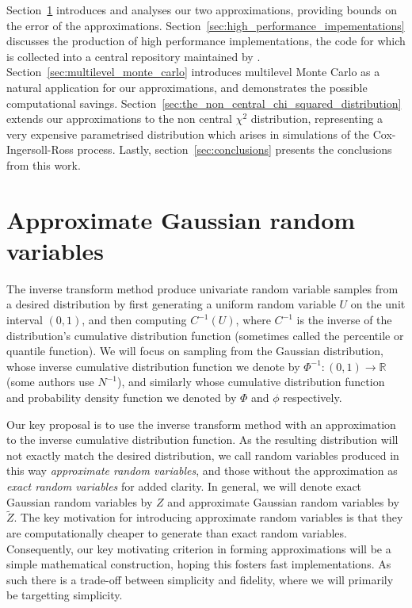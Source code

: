 \documentclass[manuscript,review]{acmart}
\begin{document}
Section~\ref{sec:approximate_gaussian_random_variables} introduces and analyses our two approximations, providing bounds on the error of the approximations. Section~\ref{sec:high_performance_impementations} discusses the production of high performance implementations, the code for which is collected into a central repository maintained by \citet{sheridan2020approximate_random,sheridan2020approximate_inverse}. Section~\ref{sec:multilevel_monte_carlo} introduces multilevel Monte Carlo as a natural application for our approximations, and demonstrates the possible computational savings. Section~\ref{sec:the_non_central_chi_squared_distribution} extends our approximations to the non central $ \chi^2 $ distribution, representing a very expensive parametrised distribution which arises in simulations of the Cox-Ingersoll-Ross process. Lastly, section~\ref{sec:conclusions} presents the conclusions from this work. 

\section{Approximate Gaussian random variables}
\label{sec:approximate_gaussian_random_variables}

The inverse transform method \citep[2.2.1]{glasserman2013monte} produce univariate random variable samples from a desired distribution by first generating a uniform random variable $U$ on the unit interval $(0,1)$, and then computing $C^{-1}(U)$, where $C^{-1}$ is the inverse of the distribution's cumulative distribution function (sometimes called the percentile or quantile function). We will focus on sampling from the Gaussian distribution, whose inverse cumulative distribution function we denote by $ \Phi^{-1} \colon (0, 1) \to \mathbb{R} $ (some authors use $ N^{-1} $), and similarly whose cumulative distribution function and probability density function we denoted by $ \Phi $ and $ \phi $ respectively. 

Our key proposal is to use the inverse transform method with an approximation to the inverse cumulative distribution function. As the resulting distribution will not exactly match the desired distribution, we call random variables produced in this way \emph{approximate random variables}, and those without the approximation as \emph{exact random variables} for added clarity. In general, we will denote exact Gaussian random variables by $ Z $ and approximate Gaussian random variables by $ \widetilde{Z} $. The key motivation for introducing approximate random variables is that they are computationally cheaper to generate than exact random variables. Consequently, our key motivating criterion in forming approximations will be a simple mathematical construction, hoping this fosters fast implementations. As such there is a trade-off between simplicity and fidelity, where we will primarily be targetting simplicity. 
\end{document}
